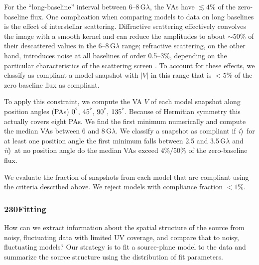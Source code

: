 For the ``long-baseline'' interval between 6--8\,$\mathrm{G}\lambda$,
the VAs have $\lesssim 4\%$ of the zero-baseline flux.
One complication when comparing models to data on long baselines is
the effect of interstellar scattering.
Diffractive scattering effectively convolves the image with a smooth
kernel and can reduce the amplitudes to about $\sim 50\%$ of their
descattered values in the 6--8\,$\mathrm{G}\lambda$ range; refractive
scattering, on the other hand, introduces noise at all baselines of
order 0.5--3\%, depending on the particular characteristics of the
scattering screen \citep{2018arXiv180501242P, 2018ApJ...865..104J}.
To account for these effects, we classify as compliant a model snapshot with $|V|$
in this range that is $< 5\%$ of the zero baseline flux as compliant.

To apply this constraint, we compute the VA $V$ of each model snapshot
along position angles (PAs) $0^\degree$, $45^\degree$, $90^\degree$,
$135^\degree$.
Because of Hermitian symmetry this actually covers eight PAs.
We find the first minimum numerically and compute the median VAs
between 6 and 8\,$\mathrm{G}\lambda$.
We classify a snapshot as compliant if
\emph{i})~for at least one position angle the first minimum falls
between 2.5 and 3.5\,$\mathrm{G}\lambda$ and
\emph{ii})~at no position angle do the median VAs exceed $4\% /
50\%$ of the zero-baseline flux.

We evaluate the fraction of snapshots from each model that are
compliant using the criteria described above.
We reject models with compliance fraction $< 1\%$.

\subsubsection{230\GHz \Mring Fitting}

How can we extract information about the spatial structure of the source from noisy, fluctuating data with limited UV coverage, and compare that to noisy, fluctuating models?
Our strategy is to fit a source-plane model to the data and summarize the source structure using the distribution of fit parameters.

